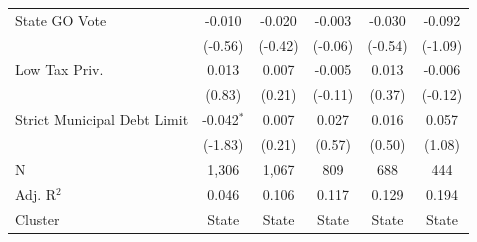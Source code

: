 \begin{tabular*}{\textwidth}{@{\extracolsep{\fill}}lccccc}
   State GO Vote               & -0.010        & -0.020         & -0.003         & -0.030        & -0.092\\
                               & (-0.56)      & (-0.42)       & (-0.06)       & (-0.54)      & (-1.09)\\
   Low Tax Priv.               & 0.013         & 0.007          & -0.005         & 0.013         & -0.006\\
                               & (0.83)       & (0.21)        & (-0.11)       & (0.37)       & (-0.12)\\
   Strict Municipal Debt Limit & -0.042$^{*}$  & 0.007          & 0.027          & 0.016         & 0.057\\
                               & (-1.83)      & (0.21)        & (0.57)        & (0.50)       & (1.08)\\
   \hline
   N                & 1,306         & 1,067          & 809            & 688           & 444\\
   Adj. R$^2$              & 0.046         & 0.106          & 0.117          & 0.129         & 0.194\\
   Cluster              & State & State & State & State & State\\
   \bottomrule
\end{tabular*}
\par\endgroup
